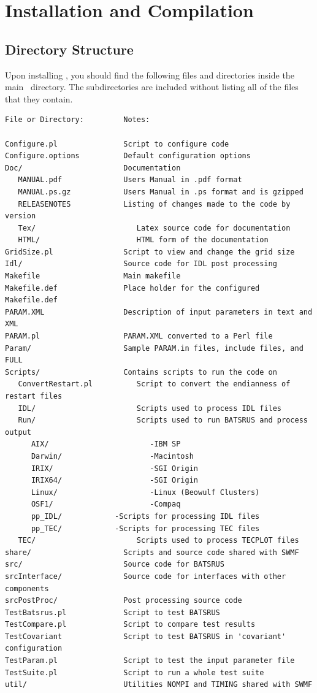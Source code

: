 \section{Installation and Compilation \label{section:install_compile}}

\subsection{Directory Structure \label{section:directory}}

Upon installing \BATSRUS, you should find the following files
and directories inside the main \BATSRUS\ directory.  
The subdirectories are included without listing
all of the files that they contain.
\begin{verbatim}
File or Directory:         Notes:

Configure.pl               Script to configure code
Configure.options          Default configuration options
Doc/                       Documentation 
   MANUAL.pdf              Users Manual in .pdf format
   MANUAL.ps.gz            Users Manual in .ps format and is gzipped
   RELEASENOTES            Listing of changes made to the code by version
   Tex/                       Latex source code for documentation
   HTML/                      HTML form of the documentation
GridSize.pl                Script to view and change the grid size
Idl/                       Source code for IDL post processing
Makefile                   Main makefile
Makefile.def               Place holder for the configured Makefile.def
PARAM.XML                  Description of input parameters in text and XML
PARAM.pl                   PARAM.XML converted to a Perl file
Param/                     Sample PARAM.in files, include files, and FULL
Scripts/                   Contains scripts to run the code on
   ConvertRestart.pl          Script to convert the endianness of restart files
   IDL/                       Scripts used to process IDL files
   Run/                       Scripts used to run BATSRUS and process output
      AIX/                       -IBM SP
      Darwin/                    -Macintosh
      IRIX/                      -SGI Origin
      IRIX64/                    -SGI Origin
      Linux/                     -Linux (Beowulf Clusters)
      OSF1/                      -Compaq
      pp_IDL/			 -Scripts for processing IDL files
      pp_TEC/			 -Scripts for processing TEC files	
   TEC/                       Scripts used to process TECPLOT files
share/                     Scripts and source code shared with SWMF
src/                       Source code for BATSRUS
srcInterface/              Source code for interfaces with other components
srcPostProc/               Post processing source code
TestBatsrus.pl             Script to test BATSRUS
TestCompare.pl             Script to compare test results
TestCovariant              Script to test BATSRUS in 'covariant' configuration
TestParam.pl               Script to test the input parameter file
TestSuite.pl               Script to run a whole test suite
util/                      Utilities NOMPI and TIMING shared with SWMF
\end{verbatim}

